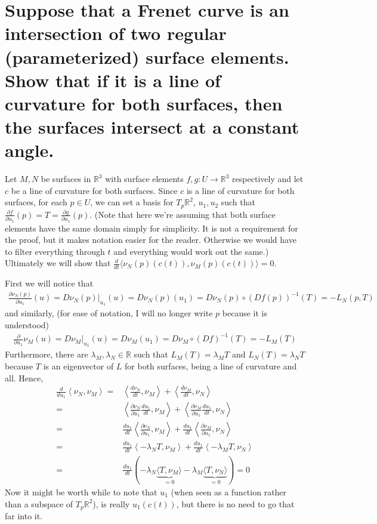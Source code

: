 \documentclass[12pt]{amsart}
\begin{document}
\newpage
\section{Suppose that a Frenet curve is an intersection of two regular (parameterized) surface elements. Show that if it is a line of curvature for both surfaces, then the surfaces intersect at a constant angle.}
\begin{comment}
	page 277
\end{comment}
Let $M,N$ be surfaces in $\mathbb{R}^3$ with surface elements $f,g:U\to\mathbb{R}^3$ respectively and let $c$ be a line of curvature for both surfaces. Since $c$ is a line of curvature for both surfaces, for each $p\in U$, we can set a basis for $T_p\mathbb{R}^2$, $u_1,u_2$ such that $\frac{\partial f}{\partial u_1}(p)=T=\frac{\partial g}{\partial u_1}(p)$. (Note that here we're assuming that both surface elements have the same domain simply for simplicity. It is not a requirement for the proof, but it makes notation easier for the reader. Otherwise we would have to filter everything through $t$ and everything would work out the same.) Ultimately we will show that $\frac{d}{dt}\langle \nu_N(p)(c(t)),\nu_M(p)(c(t))\rangle=0$.

First we will notice that 
\begin{align*}
	\frac{\partial\nu_N(p)}{\partial u_1}(u)=D\nu_N(p)\big|_{u_1}(u)=D\nu_N(p)(u_1)=D\nu_N(p)\circ\left(Df(p)\right)^{-1}(T)=-L_N(p,T)
\end{align*} and similarly, (for ease of notation, I will no longer write $p$ because it is understood)
\begin{align*}
	\frac{\partial}{\partial u_1}\nu_M(u)=D\nu_M\big|_{u_1}(u)=D\nu_M(u_1)=D\nu_M\circ\left(Df\right)^{-1}(T)=-L_M(T)
\end{align*}
Furthermore, there are $\lambda_M,\lambda_N\in\mathbb{R}$ such that $L_M(T)=\lambda_MT$ and $L_N(T)=\lambda_NT$ because $T$ is an eigenvector of $L$ for both surfaces, being a line of curvature and all. Hence,
\begin{align*}
	\frac{d}{du_1}\left\langle\nu_N,\nu_M\right\rangle=&\left\langle\frac{d\nu_N}{dt},\nu_M\right\rangle+\left\langle\frac{d\nu_M}{dt},\nu_N\right\rangle
	\\=&\left\langle\frac{\partial\nu_N}{\partial u_1}\frac{du_1}{dt},\nu_M\right\rangle+\left\langle\frac{\partial\nu_M}{\partial u_1}\frac{du_1}{dt},\nu_N\right\rangle
	\\=&\frac{du_1}{dt}\left\langle\frac{\partial\nu_N}{\partial u_1},\nu_M\right\rangle+\frac{du_1}{dt}\left\langle\frac{\partial\nu_M}{\partial u_1},\nu_N\right\rangle
	\\=&\frac{du_1}{dt}\left\langle-\lambda_NT,\nu_M\right\rangle+\frac{du_1}{dt}\left\langle-\lambda_MT,\nu_N\right\rangle
	\\=&\frac{du_1}{dt}\left(-\lambda_N\underbrace{\langle T,\nu_M\rangle}_{=0}-\lambda_M\underbrace{\langle T,\nu_N\rangle}_{=0}\right)=0
\end{align*} Now it might be worth while to note that $u_1$ (when seen as a function rather than a subspace of $T_p\mathbb{R}^2$), is really $u_1(c(t))$, but there is no need to go that far into it.
\end{document}
